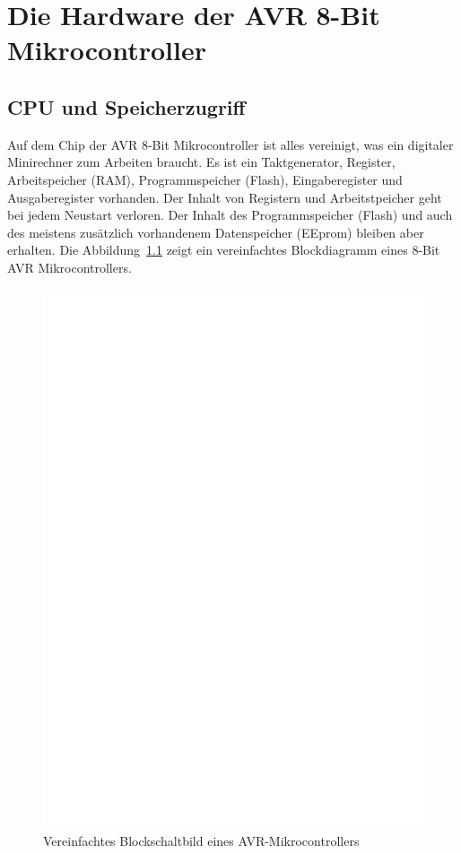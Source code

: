 \chapter{Die Hardware der AVR 8-Bit Mikrocontroller}

\section{CPU und Speicherzugriff}
Auf dem Chip der AVR 8-Bit Mikrocontroller ist alles vereinigt,
was ein digitaler Minirechner zum Arbeiten braucht.
Es ist ein Taktgenerator, Register, Arbeitspeicher (RAM), Programmspeicher (Flash),
Eingaberegister und Ausgaberegister vorhanden. 
Der Inhalt von Registern und Arbeitstpeicher geht bei jedem Neustart verloren.
Der Inhalt des Programmspeicher (Flash) und auch des meistens zusätzlich vorhandenem
Datenspeicher (EEprom) bleiben aber erhalten.
Die Abbildung~\ref{fig:block} zeigt ein vereinfachtes Blockdiagramm eines
8-Bit AVR Mikrocontrollers.

\begin{figure}[H]
\centering
\includegraphics[]{../FIG/avr_block.eps}
\caption{Vereinfachtes Blockschaltbild eines AVR-Mikrocontrollers}
\label{fig:block}
\end{figure}

